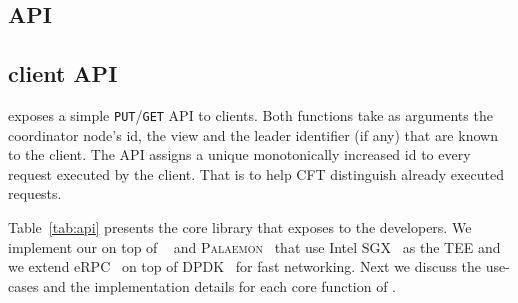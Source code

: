 


\subsection{\projecttitle{} API}

\subsection{\projecttitle{} client API}
\projecttitle{} exposes a simple \texttt{PUT}/\texttt{GET} API to clients. Both functions take as arguments the coordinator node's id, the view and the leader identifier (if any) that are known to the client. The API assigns a unique monotonically increased id to every request executed by the client. That is to help CFT distinguish already executed requests.
\fi

Table~\ref{tab:api} presents the core library that \projecttitle{} exposes to the developers. We implement our \projecttitle{} on top of \scone~\cite{arnautov2016scone} and \textsc{Palaemon}~\cite{palaemon} that use Intel SGX~\cite{intel-sgx} as the TEE and we extend eRPC~\cite{erpc} on top of DPDK~\cite{dpdk} for fast networking. Next we discuss the use-cases and the implementation details for each core function of \projecttitle{}.


